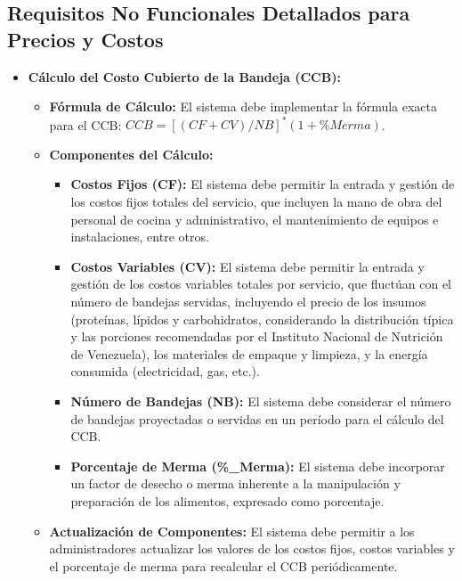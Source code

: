 \documentclass[12pt]{article}
\begin{document}
\subsection{Requisitos No Funcionales Detallados para Precios y Costos}

\begin{itemize}
    \item \textbf{Cálculo del Costo Cubierto de la Bandeja (CCB):}
    \begin{itemize}
        \item \textbf{Fórmula de Cálculo:} El sistema debe implementar la fórmula exacta para el CCB: $CCB=[(CF+CV)/NB]^{*}(1+\%Merma)$.
        \item \textbf{Componentes del Cálculo:}
        \begin{itemize}
            \item \textbf{Costos Fijos (CF):} El sistema debe permitir la entrada y gestión de los costos fijos totales del servicio, que incluyen la mano de obra del personal de cocina y administrativo, el mantenimiento de equipos e instalaciones, entre otros.
            \item \textbf{Costos Variables (CV):} El sistema debe permitir la entrada y gestión de los costos variables totales por servicio, que fluctúan con el número de bandejas servidas, incluyendo el precio de los insumos (proteínas, lípidos y carbohidratos, considerando la distribución típica y las porciones recomendadas por el Instituto Nacional de Nutrición de Venezuela), los materiales de empaque y limpieza, y la energía consumida (electricidad, gas, etc.).
            \item \textbf{Número de Bandejas (NB):} El sistema debe considerar el número de bandejas proyectadas o servidas en un período para el cálculo del CCB.
            \item \textbf{Porcentaje de Merma (\%\_Merma):} El sistema debe incorporar un factor de desecho o merma inherente a la manipulación y preparación de los alimentos, expresado como porcentaje.
        \end{itemize}
        \item \textbf{Actualización de Componentes:} El sistema debe permitir a los administradores actualizar los valores de los costos fijos, costos variables y el porcentaje de merma para recalcular el CCB periódicamente.
    \end{itemize}


\end{itemize}
\end{document}
